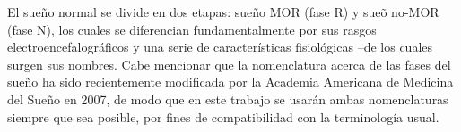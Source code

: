 El sue\~no normal se divide en dos etapas: sue\~no  MOR (fase R)
y sue\~o no-MOR (fase N), los cuales se diferencian 
fundamentalmente por sus rasgos electroencefalogr\'aficos y una serie de caracter\'isticas 
fisiol\'ogicas --de los cuales surgen sus nombres.
Cabe mencionar que
la nomenclatura acerca de las fases del sue\~no ha sido 
recientemente modificada por la Academia Americana de Medicina del Sueño en 2007, 
de modo que en este trabajo se usar\'an ambas nomenclaturas siempre que sea posible, por fines
de compatibilidad con la terminolog\'ia usual.





